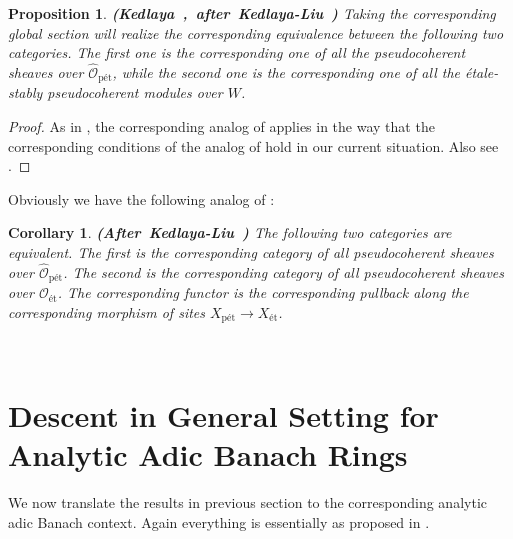 \documentclass[12pt]{amsart}
\newtheorem{proposition}[theorem]{Proposition}
\newtheorem{corollary}[theorem]{Corollary}
\theoremstyle{definition}
\numberwithin{equation}{section}
\begin{document}
\begin{proposition}\mbox{\bf{(Kedlaya \cite[Section 3.8]{Ked1}, after Kedlaya-Liu \cite[Theorem 3.4.8]{KL2})}} \label{proposition4.20}
Taking the corresponding global section will realize the corresponding equivalence between the following two categories. The first one is the corresponding one of all the pseudocoherent sheaves over $\widehat{\mathcal{O}}_\text{p\'et}$, while the second one is the corresponding one of all the \'etale-stably pseudocoherent modules over $W$.
	
\end{proposition}


\begin{proof}
As in \cite[Theorem 3.4.8]{KL2}, the corresponding analog of \cite[Proposition 9.2.6]{KL1} applies in the way that the corresponding conditions of the analog of \cite[Proposition 9.2.6]{KL1} hold in our current situation. Also see \cite[Theorem 2.9.9, Remark 2.9.10 and Lemma 1.10.4]{Ked1}.
\end{proof}




\indent Obviously we have the following analog of \cite[Corollary 3.4.9]{KL2}:



\begin{corollary} \mbox{\bf{(After Kedlaya-Liu \cite[Corollary 3.4.9]{KL2})}}
The following two categories are equivalent. The first is the corresponding category of all pseudocoherent sheaves over $\widehat{\mathcal{O}}_\text{p\'et}$. The second is the corresponding category of all pseudocoherent sheaves over ${\mathcal{O}}_\text{\'et}$. The corresponding functor is the corresponding pullback along the corresponding morphism of sites $X_{\text{p\'et}}\rightarrow X_{\text{\'et}}$. 	
\end{corollary}





\






\section{Descent in General Setting for Analytic Adic Banach Rings}

\noindent We now translate the results in previous section to the corresponding analytic adic Banach context. Again everything is essentially as proposed in \cite[Below Lemma 1.10.4, also see Section 3.8]{Ked1}.
\end{document}
